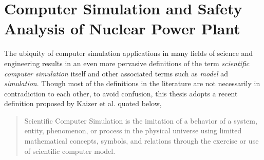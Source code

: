 \section{Computer Simulation and Safety Analysis of Nuclear Power Plant}\label{sec:intro_computer_simulation}

The ubiquity of computer simulation applications in many fields of science and engineering results in an even more pervasive definitions of the term \textit{scientific computer simulation} itself 
and other associated terms such as \textit{model} ad \textit{simulation}.
Though most of the definitions in the literature are not necessarily in contradiction to each other, to avoid confusion, this thesis adopts a recent definition proposed by Kaizer et al.\cite{Kaizer2015} quoted below,

\begin{quote}
	Scientific Computer Simulation is the imitation of a behavior of a system, entity, phenomenon, or process in the physical universe using limited mathematical concepts, symbols, and relations through the exercise or use of scientific computer model.
\end{quote}
